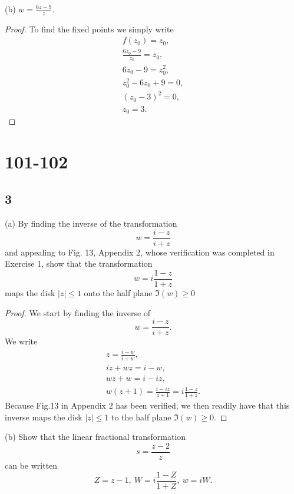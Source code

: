 \documentclass{article}
\begin{document}
(b) $w= \frac{6z-9}{z}$.
\begin{proof}
    To find the fixed points we simply write
    \begin{gather*}
        f(z_0) = z_0, \\
        \frac{6z_0-9}{z_0} = z_0, \\
        6z_0 - 9 = z_0^2,\\
        z_0^2 -6z_0 + 9 = 0,\\
        (z_0 -3)^2 = 0,\\
        z_0 = 3.
    \end{gather*}
\end{proof}

\section*{101-102}
\subsection*{3}
(a) By finding the inverse of the transformation
\begin{equation*}
    w = \frac{i-z}{i+z}
\end{equation*}
and appealing to Fig. 13, Appendix 2, whose verification was completed in Exercise 1,
show that the transformation
\begin{equation*}
    w = i\frac{1-z}{1+z}
\end{equation*}
maps the disk $|z| \leq 1$ onto the half plane $\Im(w) \geq 0$

\begin{proof}
    We start by finding the inverse of
    \begin{equation*}
        w = \frac{i-z}{i+z}.
    \end{equation*}
    We write
    \begin{gather*}
        z = \frac{i-w}{i + w},\\
        iz + wz = i - w, \\
        wz + w = i - iz, \\
        w(z + 1) = \frac{i - iz}{z + 1} = i\frac{1-z}{1+z}.
    \end{gather*}
    Because Fig.13 in Appendix 2 has been verified, we then readily have that this
    inverse maps the disk $|z|\leq 1$ to the half plane $\Im(w) \geq 0$.
\end{proof}

(b) Show that the linear fractional transformation
\begin{equation*}
    s = \frac{z-2}{z}
\end{equation*}
can be written
\begin{equation*}
    Z = z - 1, \ W = i\frac{1-Z}{1+Z}, \ w = iW.
\end{equation*}
\end{document}
